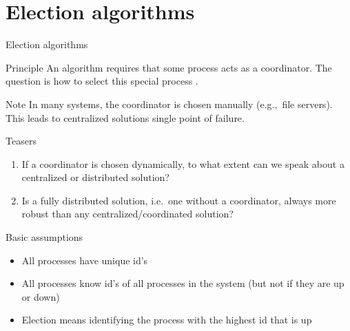 \section{Election algorithms}
\begin{slide}{Election algorithms}
  \begin{block}{Principle} 
    An algorithm requires that some process acts as a coordinator. The question is how to select this special
    process .
  \end{block}
  \begin{block}{Note} 
    In many systems, the coordinator is chosen manually (e.g.,\ file servers). This leads to centralized
    solutions \mathexpr{\Rightarrow} single point of failure.
  \end{block}
  \onslide
  \begin{block}{Teasers}
    \begin{enumerate}
    \item If a coordinator is chosen dynamically, to what extent can we speak about a centralized or
      distributed solution? 
    \item Is a fully distributed solution, i.e.\ one without a coordinator, always more robust than any
      centralized/coordinated solution?
    \end{enumerate}
  \end{block}
\end{slide}
\begin{slide}{Basic assumptions}
  \begin{block}{}
    \begin{itemize}
    \item All processes have unique id's
    \item All processes know id's of all processes in the system (but not if they are up or down)
    \item Election means identifying the process with the highest id that is up
    \end{itemize}
  \end{block}
\end{slide}
